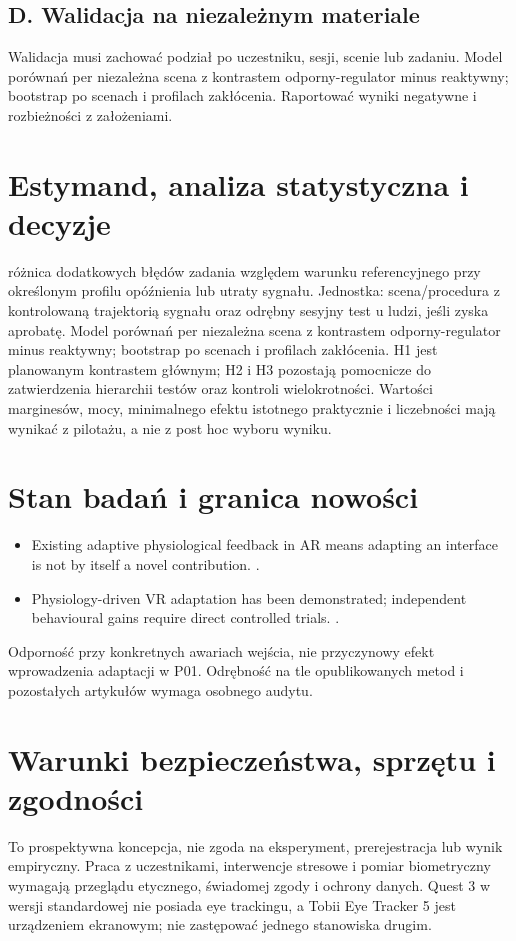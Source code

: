 \documentclass[11pt,a4paper]{article}
\begin{document}
\subsection{D. Walidacja na niezależnym materiale}
Walidacja musi zachować podział po uczestniku, sesji, scenie lub zadaniu. Model porównań per niezależna scena z kontrastem odporny-regulator minus reaktywny; bootstrap po scenach i profilach zakłócenia. Raportować wyniki negatywne i rozbieżności z założeniami.
\section{Estymand, analiza statystyczna i decyzje}
różnica dodatkowych błędów zadania względem warunku referencyjnego przy określonym profilu opóźnienia lub utraty sygnału. Jednostka: scena/procedura z kontrolowaną trajektorią sygnału oraz odrębny sesyjny test u ludzi, jeśli zyska aprobatę. Model porównań per niezależna scena z kontrastem odporny-regulator minus reaktywny; bootstrap po scenach i profilach zakłócenia. H1 jest planowanym kontrastem głównym; H2 i H3 pozostają pomocnicze do zatwierdzenia hierarchii testów oraz kontroli wielokrotności. Wartości marginesów, mocy, minimalnego efektu istotnego praktycznie i liczebności mają wynikać z pilotażu, a nie z post hoc wyboru wyniku.
\section{Stan badań i granica nowości}
\begin{itemize}
\item Existing adaptive physiological feedback in AR means adapting an interface is not by itself a novel contribution. \cite{xrprior1}.
\item Physiology-driven VR adaptation has been demonstrated; independent behavioural gains require direct controlled trials. \cite{xrprior2}.
\end{itemize}
Odporność przy konkretnych awariach wejścia, nie przyczynowy efekt wprowadzenia adaptacji w P01. Odrębność na tle opublikowanych metod i pozostałych artykułów wymaga osobnego audytu.
\section{Warunki bezpieczeństwa, sprzętu i zgodności}
To prospektywna koncepcja, nie zgoda na eksperyment, prerejestracja lub wynik empiryczny. Praca z uczestnikami, interwencje stresowe i pomiar biometryczny wymagają przeglądu etycznego, świadomej zgody i ochrony danych. Quest 3 w wersji standardowej nie posiada eye trackingu, a Tobii Eye Tracker 5 jest urządzeniem ekranowym; nie zastępować jednego stanowiska drugim.
\end{document}
